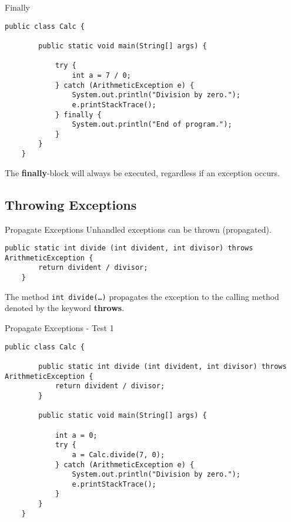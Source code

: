 \begin{frame}[fragile]{Finally}
	\begin{lstlisting}[basicstyle=\ttfamily\scriptsize]
	public class Calc {
	
	    public static void main(String[] args) {
	
	        try {
	            int a = 7 / 0;
	        } catch (ArithmeticException e) {
	            System.out.println("Division by zero.");
	            e.printStackTrace();
	        } finally {
	            System.out.println("End of program.");
	        }
	    }
	}
	\end{lstlisting}
	The \textbf{finally}-block will always be executed, regardless if an exception occurs.
\end{frame}

\subsection{Throwing Exceptions}
\begin{frame}[fragile]{Propagate Exceptions}
	Unhandled exceptions can be thrown (propagated).
	\begin{lstlisting}[basicstyle=\ttfamily\scriptsize]	
	public static int divide (int divident, int divisor) throws ArithmeticException {
	    return divident / divisor;
	}
	\end{lstlisting}
	The method \texttt{int divide(\dots)} propagates the exception to the calling
	method denoted by the keyword \textbf{throws}.
\end{frame}

\begin{frame}[fragile]{Propagate Exceptions - Test 1}
	\begin{lstlisting}[basicstyle=\ttfamily\scriptsize]
	public class Calc {
	
	    public static int divide (int divident, int divisor) throws ArithmeticException {
	        return divident / divisor;
	    }
	
	    public static void main(String[] args) {
	
	        int a = 0;
	        try {
	            a = Calc.divide(7, 0);
	        } catch (ArithmeticException e) {
	            System.out.println("Division by zero.");
	            e.printStackTrace();
	        }
	    }
	}
	\end{lstlisting}
\end{frame}

